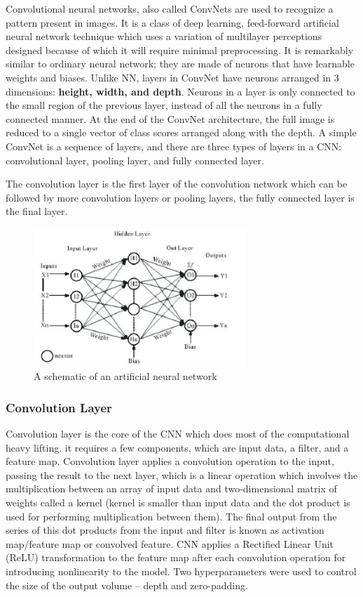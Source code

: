 Convolutional neural networks, also called ConvNets are used to recognize a pattern present in images. It is a class of deep learning, feed-forward artificial neural network technique which uses a variation of multilayer perceptions designed because of which it will require minimal preprocessing. It is remarkably similar to ordinary neural network; they are made of neurons that have learnable weights and biases. Unlike NN, layers in ConvNet have neurons arranged in 3 dimensions: \textbf{height, width, and depth}. Neurons in a layer is only connected to the small region of the previous layer, instead of all the neurons in a fully connected manner. At the end of the ConvNet architecture, the full image is reduced to a single vector of class scores arranged along with the depth. A simple ConvNet is a sequence of layers, and there are three types of layers in a CNN: convolutional layer, pooling layer, and fully connected layer. 

The convolution layer is the first layer of the convolution network which can be followed by more convolution layers or pooling layers, the fully connected layer is the final layer.   

\begin{figure} [http]
\centering
\includegraphics[width=80mm,scale=0.9]{figures/Multilayer-Perceptron-Network.png}
\caption{A schematic of an artificial neural network}
\label{fig:access_points}
\end{figure}

\subsubsection{Convolution Layer}

Convolution layer is the core of the CNN which does most of the computational heavy lifting. it requires a few components, which are input data, a filter, and a feature map. Convolution layer applies a convolution operation to the input, passing the result to the next layer, which is a linear operation which involves the multiplication between an array of input data and two-dimensional matrix of weights called a kernel (kernel is smaller than input data and the dot product is used for performing multiplication between them). The final output from the series of this dot products from the input and filter is known as activation map/feature map or convolved feature. CNN applies a Rectified Linear Unit (ReLU) transformation to the feature map after each convolution operation for introducing nonlinearity to the model. Two hyperparameters were used to control the size of the output volume – depth and zero-padding.  

